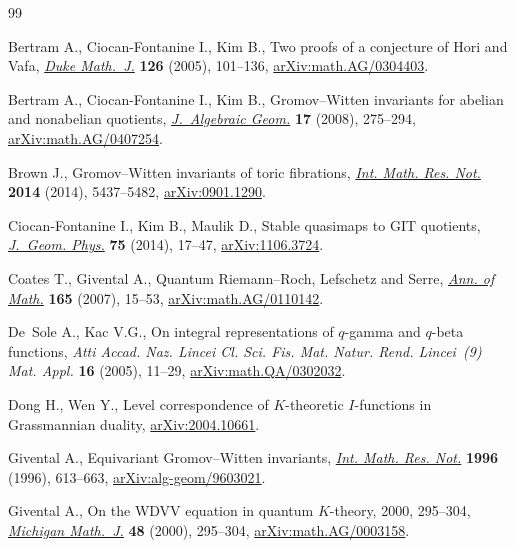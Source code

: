 \begin{thebibliography}{99}
\footnotesize\itemsep=0pt

Bertram A., Ciocan-Fontanine I., Kim B., Two proofs of a conjecture of {H}ori
 and {V}afa, \href{https://doi.org/10.1215/S0012-7094-04-12613-2}{\textit{Duke Math.~J.}} \textbf{126} (2005), 101--136,
 \href{https://arxiv.org/abs/math.AG/0304403}{arXiv:math.AG/0304403}.

Bertram A., Ciocan-Fontanine I., Kim B., Gromov--{W}itten invariants for
 abelian and nonabelian quotients, \href{https://doi.org/10.1090/S1056-3911-07-00456-0}{\textit{J.~Algebraic Geom.}} \textbf{17}
 (2008), 275--294, \href{https://arxiv.org/abs/math.AG/0407254}{arXiv:math.AG/0407254}.

Brown J., Gromov--{W}itten invariants of toric fibrations, \href{https://doi.org/10.1093/imrn/rnt030}{\textit{Int. Math.
 Res. Not.}} \textbf{2014} (2014), 5437--5482, \href{https://arxiv.org/abs/0901.1290}{arXiv:0901.1290}.

Ciocan-Fontanine I., Kim B., Maulik D., Stable quasimaps to {GIT} quotients,
 \href{https://doi.org/10.1016/j.geomphys.2013.08.019}{\textit{J.~Geom. Phys.}} \textbf{75} (2014), 17--47, \href{https://arxiv.org/abs/1106.3724}{arXiv:1106.3724}.

Coates T., Givental A., Quantum {R}iemann--{R}och, {L}efschetz and {S}erre,
 \href{https://doi.org/10.4007/annals.2007.165.15}{\textit{Ann. of Math.}} \textbf{165} (2007), 15--53, \href{https://arxiv.org/abs/math.AG/0110142}{arXiv:math.AG/0110142}.

De~Sole A., Kac V.G., On integral representations of {$q$}-gamma and {$q$}-beta
 functions, \textit{Atti Accad. Naz. Lincei Cl. Sci. Fis. Mat. Natur. Rend.
 Lincei~(9) Mat. Appl.} \textbf{16} (2005), 11--29, \href{https://arxiv.org/abs/math.QA/0302032}{arXiv:math.QA/0302032}.

Dong H., Wen Y., Level correspondence of {$K$}-theoretic {$I$}-functions in
 {G}rassmannian duality, \href{https://arxiv.org/abs/2004.10661}{arXiv:2004.10661}.

Givental A., Equivariant {G}romov--{W}itten invariants, \href{https://doi.org/10.1155/S1073792896000414}{\textit{Int. Math. Res.
 Not.}} \textbf{1996} (1996), 613--663, \href{https://arxiv.org/abs/alg-geom/9603021}{arXiv:alg-geom/9603021}.

Givental A., On the {WDVV} equation in quantum {$K$}-theory, 2000, 295--304, \href{https://doi.org/10.1307/mmj/1030132720}{\textit{Michigan Math.~J.}} \textbf{48} (2000), 295--304, \href{https://arxiv.org/abs/math.AG/0003158}{arXiv:math.AG/0003158}.


\end{thebibliography}
